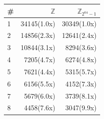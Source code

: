 \documentclass{beamer}
\begin{document}
\begin{frame}
\begin{block}
{\begin{columns}
\begin{column}{.4\textwidth}
{          \begin{tabular}{lrr}
    \toprule
    \# & $\mathbb{Z}$ &  $\mathbb{Z}_{2^{64}-1}$  \\
    \midrule
   1 & 34145(1.0x) & 30349(1.0x) \\
   2 & 14856(2.3x) & 12641(2.4x) \\ 
   3 & 10844(3.1x) & 8294(3.6x)\\ 
   4 & 7205(4.7x) & 6274(4.8x) \\ 
   5 & 7621(4.4x) & 5315(5.7x) \\ 
   6 & 6156(5.5x) & 4152(7.3x) \\ 
   7 & 5679(6.0x) & 3739(8.1x) \\ 
   8 & 4458(7.6x) & 3047(9.9x) \\
   \bottomrule
  \end{tabular}
        }
      \end{column}
      \begin{column}{.58\textwidth}
      \end{column}
    \end{columns}
    }
   \end{block}

 \end{frame}
\end{document}
